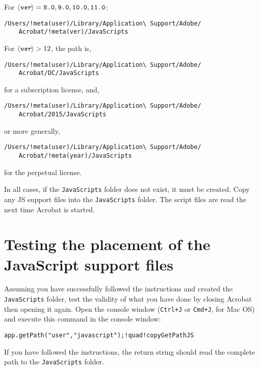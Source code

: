 \documentclass{article}
\def\app#1{\textsf{#1}}
\def\amtIndent{\parindent}
\def\meta#1{$\langle\textit{\texttt{#1}}\rangle$}
\def\SC#1{{\small#1}}
\begin{document}
\noindent
For $\text{\meta{ver}} = \texttt{8.0}, \texttt{9.0}, \texttt{10.0},
\texttt{11.0}$:
\begin{Verbatim}[xleftmargin=\amtIndent,fontsize=\small,commandchars=!()]
/Users/!meta(user)/Library/Application\ Support/Adobe/
    Acrobat/!meta(ver)/JavaScripts
\end{Verbatim}
\medskip

\noindent
For $\text{\meta{ver}} > 12$, the path is,
\begin{Verbatim}[xleftmargin=\amtIndent,fontsize=\small,commandchars=!()]
/Users/!meta(user)/Library/Application\ Support/Adobe/
    Acrobat/DC/JavaScripts
\end{Verbatim}
for a subscription license, and,
\begin{Verbatim}[xleftmargin=\amtIndent,fontsize=\small,commandchars=!()]
/Users/!meta(user)/Library/Application\ Support/Adobe/
    Acrobat/2015/JavaScripts
\end{Verbatim}
or more generally,
\begin{Verbatim}[xleftmargin=\amtIndent,fontsize=\small,commandchars=!()]
/Users/!meta(user)/Library/Application\ Support/Adobe/
    Acrobat/!meta(year)/JavaScripts
\end{Verbatim}
for the perpetual license.

In all cases, if the \texttt{JavaScripts} folder does not exist, it must
be created. Copy any \SC{JS} support files into the \texttt{JavaScripts}
folder. The script files are read the next time \app{Acrobat} is started.

\section{Testing the placement of the JavaScript support files}

Assuming you have successfully followed the instructions and created the
\texttt{JavaScripts} folder, test the validity of what you have done by
closing \app{Acrobat} then opening it again. Open the console window
(\texttt{Ctrl+J} or \texttt{Cmd+J}, for \app{Mac OS}) and execute this
command in the console window:
\begin{Verbatim}[xleftmargin=\amtIndent,commandchars={!~@}]
app.getPath("user","javascript");!quad!copyGetPathJS
\end{Verbatim}
If you have followed the instructions, the return string should read the
complete path to the \texttt{JavaScripts} folder.
\end{document}
